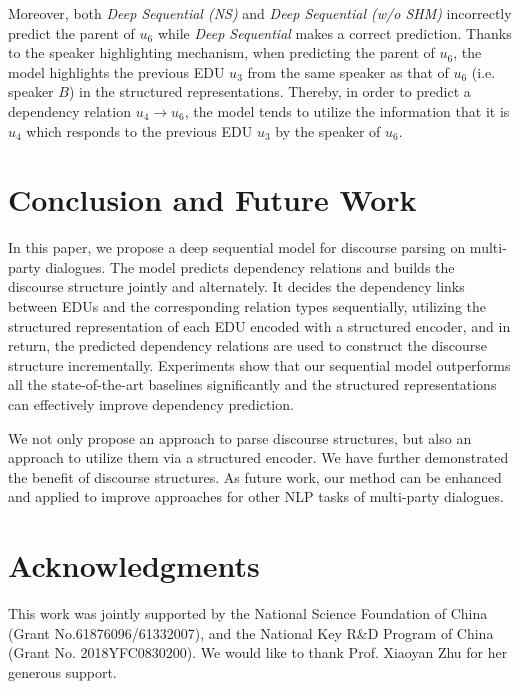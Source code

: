 \documentclass[letterpaper]{article} \usepackage{aaai19}  \usepackage{times}  \usepackage{helvet}  \usepackage{courier}  \usepackage{url}  \usepackage{graphicx}  \usepackage{amssymb}
\begin{document}
Moreover, both \emph{Deep Sequential (NS)} and \emph{Deep Sequential (w/o SHM)} incorrectly predict the parent of $u_6$ while \emph{Deep Sequential} makes a correct prediction. 
Thanks to the speaker highlighting mechanism, when predicting the parent of $u_6$, the model highlights the previous EDU $u_3$ from the same speaker as that of $u_6$ (i.e. speaker $B$) in the structured representations.
Thereby, in order to predict a dependency relation $u_4\rightarrow u_6$, the model tends to utilize the information that 
it is $u_4$ which responds to the previous EDU $u_3$ by the speaker of $u_6$.

\section{Conclusion and Future Work}

In this paper, we propose a deep sequential model for discourse parsing on multi-party dialogues. The model predicts dependency relations and builds the discourse structure jointly and alternately. It decides the dependency links between EDUs and the corresponding relation types sequentially, utilizing the structured representation of each EDU encoded with a structured encoder, and in return, the predicted dependency relations are used to construct the discourse structure incrementally.
Experiments show that our sequential model outperforms all the state-of-the-art baselines significantly and the structured representations can effectively improve dependency prediction.

We not only propose an approach to parse discourse structures, but also an approach to utilize them via a structured encoder. We have further demonstrated the benefit of discourse structures. As future work, our method can be enhanced and applied to improve approaches for other NLP tasks of multi-party dialogues.

\section{Acknowledgments}

This work was jointly supported by the National Science Foundation of China  (Grant No.61876096/61332007), and
the National Key R\&D Program of China (Grant No. 2018YFC0830200). We would like to thank Prof. Xiaoyan Zhu for her generous support.


 
\end{document}
